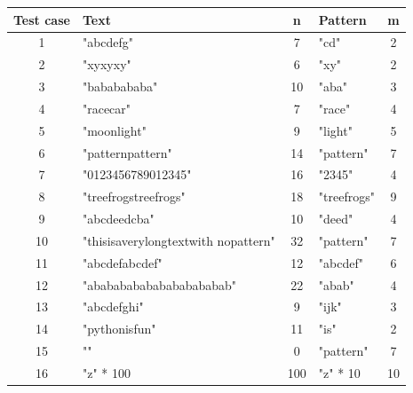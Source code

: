 \documentclass[11pt]{article}
\begin{document}
                \begin{table}[H]
                    \centering
                        \begin{tabularx}{\textwidth}{|c|X|c|X|c|}
                            \hline
                            \textbf{Test case} & \textbf{Text} & \textbf{n} & \textbf{Pattern} & \textbf{m} \\
                            \hline
                            1 & "abcdefg" & 7 & "cd" & 2 \\
                            \hline
                            2 & "xyxyxy" & 6 & "xy" & 2 \\
                            \hline
                            3 & "bababababa" & 10 & "aba" & 3 \\
                            \hline
                            4 & "racecar" & 7 & "race" & 4 \\
                            \hline
                            5 & "moonlight" & 9 & "light" & 5 \\
                            \hline
                            6 & "patternpattern" & 14 & "pattern" & 7 \\
                            \hline
                            7 & "0123456789012345" & 16 & "2345" & 4 \\
                            \hline
                            8 & "treefrogstreefrogs" & 18 & "treefrogs" & 9 \\
                            \hline
                            9 & "abcdeedcba" & 10 & "deed" & 4 \\
                            \hline
                            10 & "thisisaverylongtextwith nopattern" & 32 & "pattern" & 7 \\
                            \hline
                            11 & "abcdefabcdef" & 12 & "abcdef" & 6 \\
                            \hline
                            12 & "ababababababababababab" & 22 & "abab" & 4 \\
                            \hline
                            13 & "abcdefghi" & 9 & "ijk" & 3 \\
                            \hline
                            14 & "pythonisfun" & 11 & "is" & 2 \\
                            \hline
                            15 & "" & 0 & "pattern" & 7 \\
                            \hline
                            16 & "z" * 100 & 100 & "z" * 10 & 10 \\

\end{tabularx}
\end{table}
\end{document}
